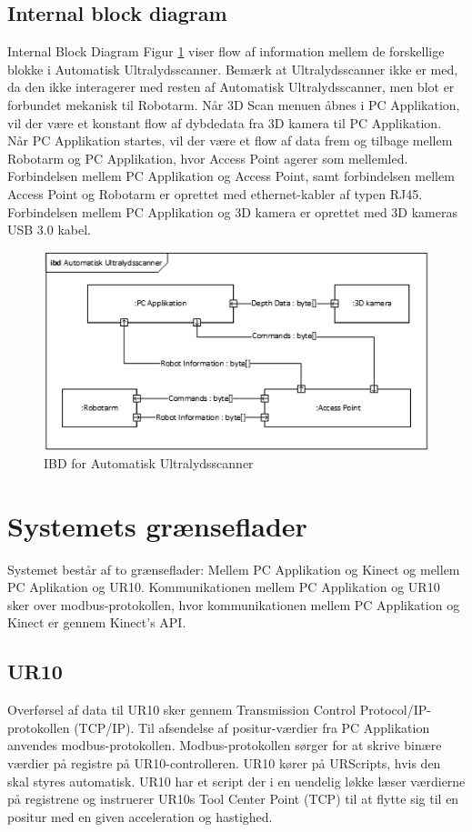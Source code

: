 \subsection{Internal block diagram}
Internal Block Diagram Figur \ref{IBD} viser flow af information mellem de forskellige blokke i Automatisk Ultralydsscanner.
Bemærk at Ultralydsscanner ikke er med, da den ikke interagerer med resten af Automatisk Ultralydsscanner, men blot er forbundet mekanisk til Robotarm.
Når 3D Scan menuen åbnes i PC Applikation, vil der være et konstant flow af dybdedata fra 3D kamera til PC Applikation.
Når PC Applikation startes, vil der være et flow af data frem og tilbage mellem Robotarm og PC Applikation, hvor Access Point agerer som mellemled. 
Forbindelsen mellem PC Applikation og Access Point, samt forbindelsen mellem Access Point og Robotarm er oprettet med ethernet-kabler af typen RJ45.
Forbindelsen mellem PC Applikation og 3D kamera er oprettet med 3D kameras USB 3.0 kabel. 

\begin{figure}[H]
    \centering
    \includegraphics[width=1\textwidth]{figurer/d/Design/IBD}
    \caption{IBD for Automatisk Ultralydsscanner}
    \label{IBD}
\end{figure}

\section{Systemets grænseflader}
Systemet består af to grænseflader: Mellem PC Applikation og Kinect og mellem PC Aplikation og UR10. Kommunikationen mellem PC Applikation og UR10 sker over modbus-protokollen, hvor kommunikationen mellem PC Applikation og Kinect er gennem Kinect's API.

\subsection{UR10}
Overførsel af data til UR10 sker gennem Transmission Control Protocol/IP-protokollen (TCP/IP). Til afsendelse af positur-værdier fra PC Applikation anvendes modbus-protokollen. Modbus-protokollen sørger for at skrive binære værdier på registre på UR10-controlleren. UR10 kører på URScripts, hvis den skal styres automatisk. UR10 har et script der i en uendelig løkke læser værdierne på registrene og instruerer UR10s Tool Center Point (TCP) til at flytte sig til en positur med en given acceleration og hastighed.

